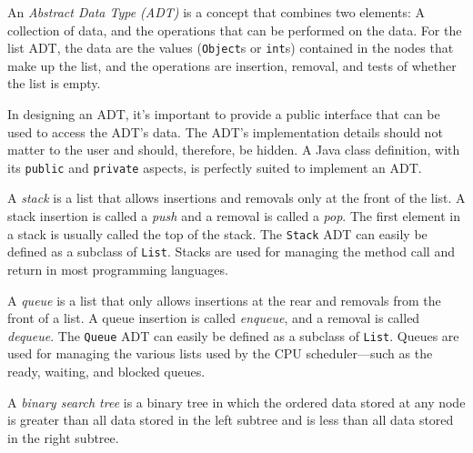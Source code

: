 \begin{SMBL}
\item  An {\it Abstract Data Type (ADT)} is a concept
that combines two elements: A collection of data, and the operations
that can be performed on the data.  For the list ADT, the data are the
values ({\tt Object}s or {\tt int}s) contained in the nodes that make
up the list, and the operations are insertion, removal, and tests of
whether the list is empty.

\item  In designing an ADT, it's important to provide a public
interface that can be used to access the ADT's data.  The ADT's
implementation details should not matter to the user and should,
therefore, be hidden.  A Java class definition, with its {\tt public}
and {\tt private} aspects, is perfectly suited to implement an ADT.

\item  A {\it stack} is a list that allows insertions and removals
only at the front of the list.  A stack insertion is called a {\it
push} and a removal is called a {\it pop}. The first element in a
stack is usually called the top of the stack.   The {\tt Stack} ADT can
easily be defined as a subclass of {\tt List}. Stacks are used
for managing the method call and return in most programming languages.

\item  A {\it queue} is a list that only allows insertions at the
rear and removals from the front of a list.  A queue insertion is
called {\it enqueue}, and a removal is called {\it dequeue}.  The
{\tt Queue} ADT can easily be defined as a subclass of {\tt List}. Queues
are used for managing the various lists used by the CPU scheduler---such as
the ready, waiting, and blocked queues.

\item  A {\it binary search tree} is a binary tree in which the ordered data
stored at any node is greater than all data stored in the left 
subtree and is less
than all data stored in the right subtree.
\end{SMBL}



\secANSH

